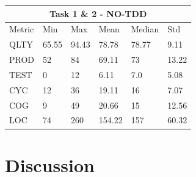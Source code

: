\noindent
\begin{tabular}{ |p{2cm}||p{1.6cm}|p{1.6cm}|p{1.6cm}|p{1.6cm}|p{1.6cm}|}
    \hline
        \multicolumn{6}{|c|}{Task 1 \& 2 - NO-TDD} \\
    \hline
        Metric & Min & Max & Mean & Median & Std\\
    \hline
        QLTY & 65.55 & 94.43 & 78.78 & 78.77 & 9.11 \\
        PROD & 52 & 84 & 69.11 & 73 & 13.22 \\
        TEST & 0 & 12 & 6.11 & 7.0 & 5.08 \\
        CYC & 12 & 36 & 19.11 & 16 & 7.07 \\
        COG & 9 & 49 & 20.66 & 15 & 12.56 \\
        LOC & 74 & 260 & 154.22 & 157 & 60.32 \\
    \hline
\end{tabular}


\section{Discussion}